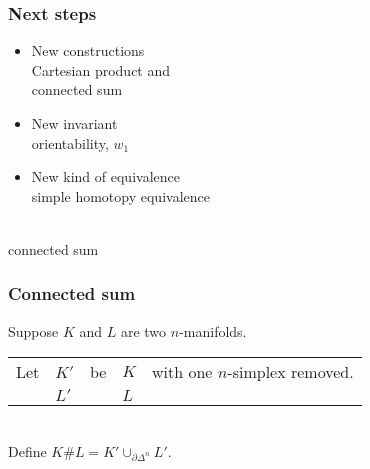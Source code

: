 \documentclass[14pt]{beamer}
\newcommand{\boundary}{\partial}
\newcommand{\setbackgroundpicture}[1]{%
\usebackgroundtemplate{
\begin{pgfpicture}{0in}{0in}{\paperwidth}{\paperheight}
\pgfputat{\pgfxy(0,0)}{\texttt{[image: \#1]}}
\color{white}
\pgfsetfillopacity{0.8}
\pgfrect[fill]{\pgfxy(0,0)}{\pgfpoint{\paperwidth}{\paperheight}}
\end{pgfpicture}
}
}
\newcommand{\clearbackgroundpicture}{\usebackgroundtemplate{}}
\begin{document}
\setbackgroundpicture{Stair10.jpg}
\begin{frame}
  \frametitle{Next steps}
  \pause
  \begin{itemize}
    \item New constructions \pause\\
      \textcolor{green!50!black}{Cartesian product} \pause and \\
      \textcolor{green!50!black}{connected sum}\pause
    \item New invariant \pause\\
      \textcolor{green!50!black}{orientability, $w_1$}\pause
    \item New kind of equivalence \pause\\
      \textcolor{green!50!black}{simple homotopy equivalence}
 \end{itemize}

\end{frame}
\clearbackgroundpicture



\begin{frame}
  \vfill
  \begin{center}
    \scalebox{5}{\Huge $\#$} \\
   \vspace{2ex}\hspace{-2em}connected sum
  \end{center}
  \vfill
\end{frame}

\begin{frame}
  \frametitle{Connected sum}

  \begin{definition}
  Suppose $K$ and $L$ are two $n$-manifolds. \\
  \vspace{1ex}%
  \begin{tabular}{@{}l@{ }l@{ }l@{ }l@{ }l}
  Let & $K'$ & be & $K$ & with one $n$-simplex removed. \\
   & $L'$ &  & $L$ &
  \end{tabular} \\
  \vspace{1ex}Define $K \# L = K' \cup_{\boundary \Delta^n} L'$.
\end{definition}

\vfill
\begin{columns}
\begin{column}{0.5\textwidth}
\end{column}
\begin{column}{0.5\textwidth}
\end{column}
\end{columns}

\end{frame}
\end{document}

